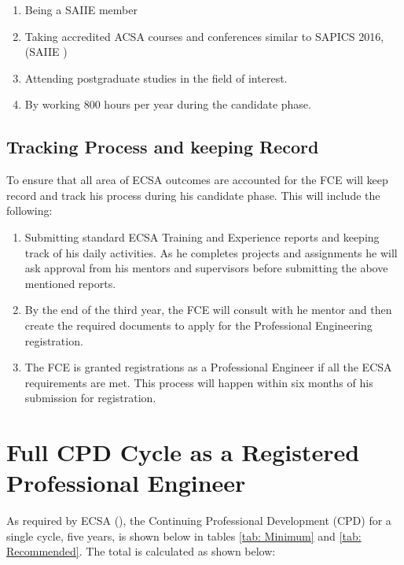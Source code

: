 \documentclass[11pt,a4paper]{article}
\begin{document}
\begin{itemize}
		\begin{enumerate}
		
		\item	Being a SAIIE member
		
		\item	Taking accredited ACSA courses and conferences similar to SAPICS 2016, (SAIIE \citeyear{SAIIEa})
		
		\item	Attending postgraduate studies in the field of interest.
		
		\item	By working 800 hours per year during the candidate phase.
		
		\end{enumerate}
	
	\end{itemize}	
	
	\subsection{Tracking Process and keeping Record}
		To ensure that all area of ECSA outcomes are accounted for the FCE will keep record and track his process during his candidate phase. This will include the following:
		
	\begin{enumerate}
	
	\item	Submitting standard ECSA Training and Experience reports and keeping track of his daily activities.
			As he completes projects and assignments he will ask approval from his mentors and supervisors before submitting the above mentioned reports. 
			
	\item	By the end of the third year, the FCE will consult with he mentor and then create the required documents to apply for the Professional Engineering registration.
	
	\item	The FCE is granted registrations as a Professional Engineer if all the ECSA requirements are met. 
	This process will happen within six months of his submission for registration.
	\end{enumerate}
	
	\section{Full CPD Cycle as a Registered Professional Engineer}
	As required by ECSA (\citeyear{ECSA_2013c}), the Continuing Professional Development (CPD) for a single cycle, five years, is shown below in tables \ref{tab: Minimum} and \ref{tab: Recommended}. The total is calculated as shown below:
	
\end{document}
